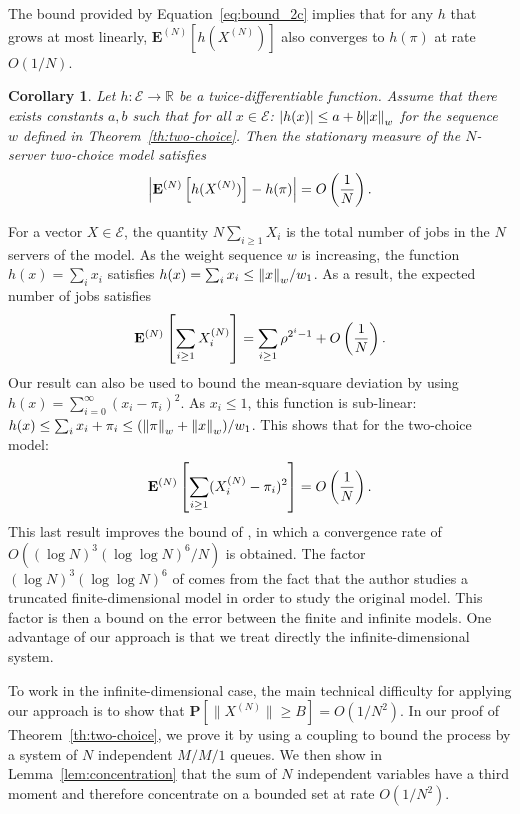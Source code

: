 \documentclass[sigconf]{acmart}
\newcommand\XN{X^{(N)}}
\newcommand\E{\mathcal{E}}
\newcommand\R{\mathbb{R}}
\newcommand\espN[1]{{\mathchoice{\bespN{#1}}{\sespN{#1}}{\sespN{#1}}{\sespN{#1}}}}
\newcommand\bespN[1]{\mathbf{E}^{(N)}\left[#1\right]}
\newcommand\sespN[1]{\mathbf{E}^{(N)}[#1]}
\newcommand\sProba[1]{\mathbf{P}[#1]}
\newcommand\norm[1]{{\mathchoice{\bnorm{#1}}{\snorm{#1}}{\snorm{#1}}{\snorm{#1}}}}
\newcommand\bnorm[1]{\left\|#1\right\|}
\newcommand\snorm[1]{\|#1\|}
\newcommand\abs[1]{\left|#1\right|}
\newcommand\p[1]{\left(#1\right)}
\newtheorem{coro}{Corollary}
\begin{document}
The bound provided by Equation~\eqref{eq:bound_2c} implies that for
any $h$ that grows at most linearly, $\sespN{h(\XN)}$ also converges
to $h(\pi)$ at rate $O(1/N)$.
\begin{coro}
  \label{coro:two-choice}
  Let $h:\E\to\R$ be a twice-differentiable function. Assume that
  there exists constants $a,b$ such that for all $x\in\E$:
  $|h(x)|\le a+b\norm{x}_w$ for the sequence $w$ defined in
  Theorem~\ref{th:two-choice}. Then the stationary measure of the
  $N$-server two-choice model satisfies
  \begin{align*}
    \abs{\espN{h(\XN)}-h(\pi)}=O\p{\frac1N}.
  \end{align*}
\end{coro}
For a vector $X\in\E$, the quantity
$N\sum_{i\ge 1}X_i$ is the total number of jobs in the $N$ servers of
the model. As the weight sequence $w$ is increasing, the function
$h(x)=\sum_ix_i$ satisfies $h(x)=\sum_ix_i\le \norm{x}_w/w_1$. As a
result, the expected number of jobs satisfies
\begin{align}
  \label{eq:avg_2c}
  \espN{\sum_{i\ge1}\XN_i} 
  = \sum_{i\ge1} \rho^{2^i-1} +
  O\p{\frac1N}.
\end{align}
Our result can also be used to bound the mean-square deviation by
using $h(x)=\sum_{i=0}^\infty(x_i-\pi_i)^2$. As $x_i\le1$, this
function is sub-linear:
$h(x)\le \sum_ix_i+\pi_i \le (\norm{\pi}_w + \norm{x}_w)/w_1$. This
shows that for the two-choice model:
\begin{align*}
  \espN{\sum_{i\ge1}(\XN_i-\pi_i)^2} = O\p{\frac1N}. 
\end{align*}
This last result improves the bound of \cite{ying2016twochoice}, in
which a convergence rate of $O((\log N)^3(\log\log N)^6 /N)$ is
obtained. The factor $(\log N)^3(\log\log N)^6$ of
\cite{ying2016twochoice} comes from the fact that the author studies a
truncated finite-dimensional model in order to study the original
model.  This factor is then a bound on the error between the finite
and infinite models.  One advantage of our approach is that we treat
directly the infinite-dimensional system.


To work in the infinite-dimensional case, the main technical
difficulty for applying our approach is to show that
$\sProba{\snorm{\XN}\ge B}=O(1/N^2)$. In our proof of
Theorem~\ref{th:two-choice}, we prove it by using a coupling to bound
the process by a system of $N$ independent $M/M/1$ queues. We then
show in Lemma~\ref{lem:concentration} that the sum of $N$ independent
variables have a third moment and therefore concentrate on a bounded
set at rate $O(1/N^2)$.  
\end{document}
